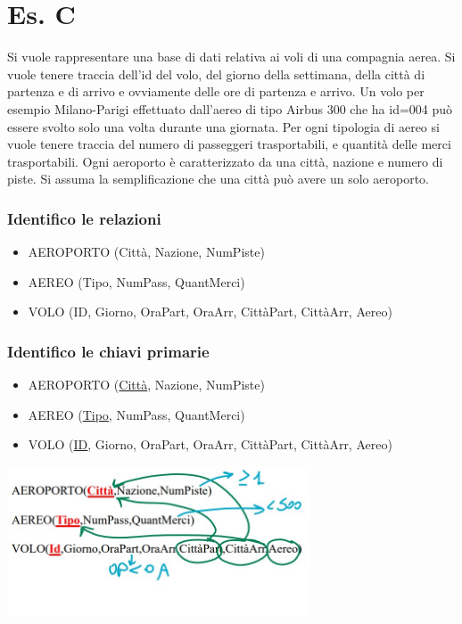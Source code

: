 \section{Es. C}
Si vuole rappresentare una base di dati relativa ai voli di una compagnia aerea. Si vuole tenere traccia dell'id del volo, del giorno della settimana, della città di partenza e di arrivo e ovviamente delle ore di partenza e arrivo. Un volo per esempio Milano-Parigi effettuato dall'aereo di tipo Airbus 300 che ha id=004 può essere svolto solo una volta durante una giornata. Per ogni tipologia di aereo si vuole tenere traccia del numero di passeggeri trasportabili, e quantità delle merci trasportabili. Ogni aeroporto è caratterizzato da una città, nazione e numero di piste. Si assuma la semplificazione che una città può avere un solo aeroporto.

\subsubsection{Identifico le relazioni}
\begin{itemize}
    \item AEROPORTO (Città, Nazione, NumPiste)
    \item AEREO (Tipo, NumPass, QuantMerci)
    \item VOLO (ID, Giorno, OraPart, OraArr, CittàPart, CittàArr, Aereo)
\end{itemize}

\subsubsection{Identifico le chiavi primarie}
\begin{itemize}
    \item AEROPORTO (\underline{Città}, Nazione, NumPiste)
    \item AEREO (\underline{Tipo}, NumPass, QuantMerci)
    \item VOLO (\underline{ID}, Giorno, OraPart, OraArr, CittàPart, CittàArr, Aereo)
\end{itemize}
\begin{center}
    \includegraphics[width=0.675\textwidth]{chaptersLezioniSara/img/MR_fileesC.jpg}
\end{center}

